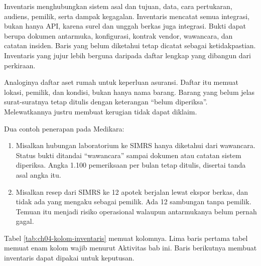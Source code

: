 Inventaris menghubungkan sistem asal dan tujuan, data, cara pertukaran, audiens, pemilik, serta dampak
kegagalan. Inventaris mencatat semua integrasi, bukan hanya API, karena surel dan unggah berkas juga integrasi.
Bukti dapat berupa dokumen antarmuka, konfigurasi, kontrak vendor, wawancara, dan catatan insiden. Baris yang
belum diketahui tetap dicatat sebagai ketidakpastian. Inventaris yang jujur lebih berguna daripada daftar
lengkap yang dibangun dari perkiraan.

Analoginya daftar aset rumah untuk keperluan asuransi. Daftar itu memuat lokasi, pemilik, dan kondisi, bukan
hanya nama barang. Barang yang belum jelas surat-suratnya tetap ditulis dengan keterangan ``belum diperiksa''.
Melewatkannya justru membuat kerugian tidak dapat diklaim.

Dua contoh penerapan pada Medikara:
\begin{enumerate}
  \item Misalkan hubungan laboratorium ke SIMRS hanya diketahui dari wawancara. Status bukti ditandai
        ``wawancara'' sampai dokumen atau catatan sistem diperiksa. Angka 1.100 pemeriksaan per bulan tetap
        ditulis, disertai tanda asal angka itu.
  \item Misalkan resep dari SIMRS ke 12 apotek berjalan lewat ekspor berkas, dan tidak ada yang mengaku
        sebagai pemilik. Ada 12 sambungan tanpa pemilik. Temuan itu menjadi risiko operasional walaupun
        antarmukanya belum pernah gagal.
\end{enumerate}

Tabel \ref{tab:ch04-kolom-inventaris} memuat kolomnya. Lima baris pertama tabel memuat enam kolom wajib
menurut Aktivitas bab ini. Baris berikutnya membuat inventaris dapat dipakai untuk keputusan.

